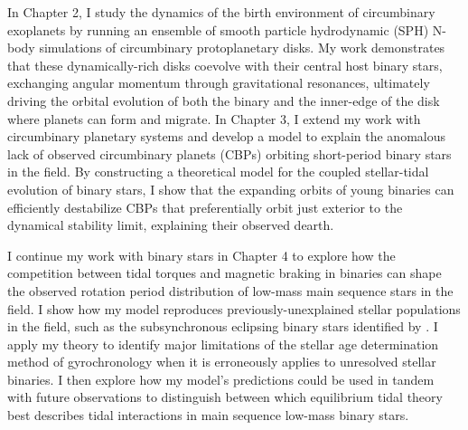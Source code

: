 In Chapter 2, I study the dynamics of the birth environment of circumbinary exoplanets by running an ensemble of smooth particle hydrodynamic (SPH) N-body simulations of circumbinary protoplanetary disks. My work demonstrates that these dynamically-rich disks coevolve with their central host binary stars, exchanging angular momentum through gravitational resonances, ultimately driving the orbital evolution of both the binary and the inner-edge of the disk where planets can form and migrate. In Chapter 3, I extend my work with circumbinary planetary systems and develop a model to explain the anomalous lack of observed circumbinary planets (CBPs) orbiting short-period binary stars in the \kepler field. By constructing a theoretical model for the coupled stellar-tidal evolution of binary stars, I show that the expanding orbits of young binaries can efficiently destabilize CBPs that preferentially orbit just exterior to the dynamical stability limit, explaining their observed dearth.

I continue my work with binary stars in Chapter 4 to explore how the competition between tidal torques and magnetic braking in binaries can shape the observed rotation period distribution of low-mass main sequence stars in the \kepler field. I show how my model reproduces previously-unexplained stellar populations in the \kepler field, such as the subsynchronous eclipsing binary stars identified by \citet{Lurie2017}. I apply my theory to identify major limitations of the stellar age determination method of gyrochronology when it is erroneously applies to unresolved stellar binaries. I then explore how my model's predictions could be used in tandem with future observations to distinguish between which equilibrium tidal theory best describes tidal interactions in main sequence low-mass binary stars.

